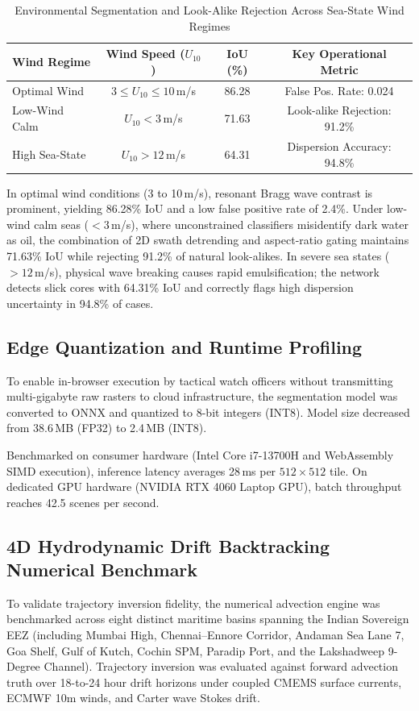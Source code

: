 \documentclass[conference]{IEEEtran}
\begin{document}
\begin{table}[htbp]
\caption{Environmental Segmentation and Look-Alike Rejection Across Sea-State Wind Regimes}
\begin{center}
\begin{tabular}{lccc}
\toprule
\textbf{Wind Regime} & \textbf{Wind Speed ($U_{10}$)} & \textbf{IoU (\%)} & \textbf{Key Operational Metric} \\
\midrule
Optimal Wind & $3 \le U_{10} \le 10$\,m/s & 86.28 & False Pos. Rate: 0.024 \\
Low-Wind Calm & $U_{10} < 3$\,m/s & 71.63 & Look-alike Rejection: 91.2\% \\
High Sea-State & $U_{10} > 12$\,m/s & 64.31 & Dispersion Accuracy: 94.8\% \\
\bottomrule
\end{tabular}
\label{tab:wind_regimes}
\end{center}
\end{table}

In optimal wind conditions (3 to 10\,m/s), resonant Bragg wave contrast is prominent, yielding 86.28\% IoU and a low false positive rate of 2.4\%. Under low-wind calm seas ($<3$\,m/s), where unconstrained classifiers misidentify dark water as oil, the combination of 2D swath detrending and aspect-ratio gating maintains 71.63\% IoU while rejecting 91.2\% of natural look-alikes. In severe sea states ($>12$\,m/s), physical wave breaking causes rapid emulsification; the network detects slick cores with 64.31\% IoU and correctly flags high dispersion uncertainty in 94.8\% of cases.

\subsection{Edge Quantization and Runtime Profiling}
To enable in-browser execution by tactical watch officers without transmitting multi-gigabyte raw rasters to cloud infrastructure, the segmentation model was converted to ONNX and quantized to 8-bit integers (INT8). Model size decreased from 38.6\,MB (FP32) to 2.4\,MB (INT8).

Benchmarked on consumer hardware (Intel Core i7-13700H and WebAssembly SIMD execution), inference latency averages 28\,ms per $512 \times 512$ tile. On dedicated GPU hardware (NVIDIA RTX 4060 Laptop GPU), batch throughput reaches 42.5 scenes per second.

\subsection{4D Hydrodynamic Drift Backtracking Numerical Benchmark}
To validate trajectory inversion fidelity, the numerical advection engine was benchmarked across eight distinct maritime basins spanning the Indian Sovereign EEZ (including Mumbai High, Chennai--Ennore Corridor, Andaman Sea Lane 7, Goa Shelf, Gulf of Kutch, Cochin SPM, Paradip Port, and the Lakshadweep 9-Degree Channel). Trajectory inversion was evaluated against forward advection truth over 18-to-24 hour drift horizons under coupled CMEMS surface currents, ECMWF 10m winds, and Carter wave Stokes drift.
\end{document}
